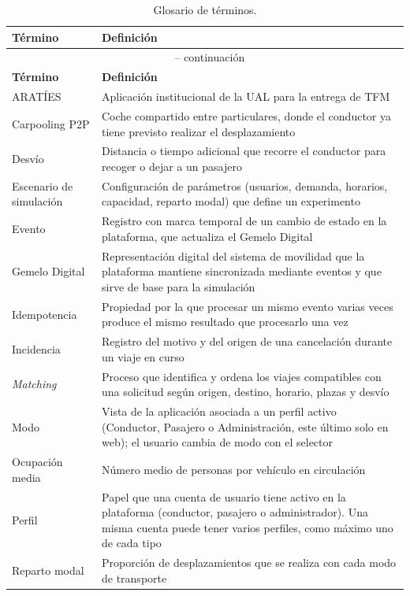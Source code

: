 \begin{longtable}{p{3.5cm} p{11.66cm}}
  \caption{Glosario de términos.}
  \label{tab:glosario}\\
  \hline
  \textbf{Término} & \textbf{Definición} \\
  \hline
  \endfirsthead
  \multicolumn{2}{c}{\tablename\ \thetable{} -- continuación}\\
  \hline
  \textbf{Término} & \textbf{Definición} \\
  \hline
  \endhead
  ARATÍES & Aplicación institucional de la UAL para la entrega de TFM \\
  Carpooling P2P & Coche compartido entre particulares, donde el conductor ya tiene previsto realizar el desplazamiento \\
  Desvío & Distancia o tiempo adicional que recorre el conductor para recoger o dejar a un pasajero \\
  Escenario de simulación & Configuración de parámetros (usuarios, demanda, horarios, capacidad, reparto modal) que define un experimento \\
  Evento & Registro con marca temporal de un cambio de estado en la plataforma, que actualiza el Gemelo Digital \\
  Gemelo Digital & Representación digital del sistema de movilidad que la plataforma mantiene sincronizada mediante eventos y que sirve de base para la simulación \\
  Idempotencia & Propiedad por la que procesar un mismo evento varias veces produce el mismo resultado que procesarlo una vez \\
  Incidencia & Registro del motivo y del origen de una cancelación durante un viaje en curso \\
  \textit{Matching} & Proceso que identifica y ordena los viajes compatibles con una solicitud según origen, destino, horario, plazas y desvío \\
  Modo & Vista de la aplicación asociada a un perfil activo (Conductor, Pasajero o Administración, este último solo en web); el usuario cambia de modo con el selector \\
  Ocupación media & Número medio de personas por vehículo en circulación \\
  Perfil & Papel que una cuenta de usuario tiene activo en la plataforma (conductor, pasajero o administrador). Una misma cuenta puede tener varios perfiles, como máximo uno de cada tipo \\
  Reparto modal & Proporción de desplazamientos que se realiza con cada modo de transporte \\

\end{longtable}
